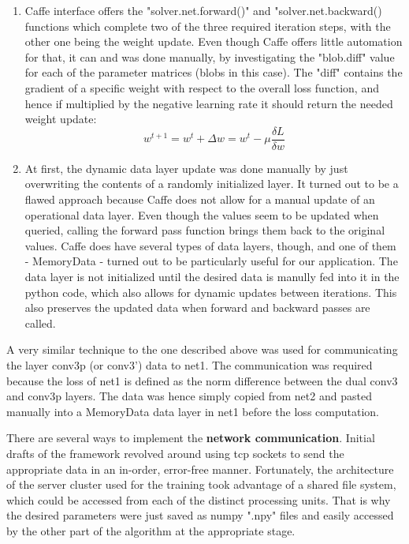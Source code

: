 \documentclass[a4paper, 12pt]{article}
\numberwithin{equation}{section}
\begin{document}
	\begin{enumerate}
		\item Caffe interface offers the "solver.net.forward()" and "solver.net.backward() functions which complete two of the three required iteration steps, with the other one being the weight update. Even though Caffe offers little automation for that, it can and was done manually, by investigating the "blob.diff" value for each of the parameter matrices (blobs in this case). The "diff" contains the gradient of a specific weight with respect to the overall loss function, and hence if multiplied by the negative learning rate it should return the needed weight update:
		\begin{equation}
		w^{t+1} = w^t + \Delta w = w^t - \mu \frac{\delta L}{\delta w}
		\end{equation}
		\item At first, the dynamic data layer update was done manually by just overwriting the contents of a randomly initialized layer.  It turned out to be a flawed approach because Caffe does not allow for a manual update of an operational data layer. Even though the values seem to be updated when queried, calling the forward pass function brings them back to the original values. Caffe does have several types of data layers, though, and one of them - MemoryData - turned out to be particularly useful for our application. The data layer is not initialized until the desired data is manully fed into it in the python code, which also allows for dynamic updates between iterations. This also preserves the updated data when forward and backward passes are called.
	\end{enumerate}
	
	A very similar technique to the one described above was used for communicating the layer conv3p (or conv3') data to net1. The communication was required because the loss of net1 is defined as the norm difference between the dual conv3 and conv3p layers. The data was hence simply copied from net2 and pasted manually into a MemoryData data layer in net1 before the loss computation.
	
	There are several ways to implement the \textbf{network communication}. Initial drafts of the framework revolved around using tcp sockets to send the appropriate data in an in-order, error-free manner. Fortunately, the architecture of the server cluster used for the training took advantage of a shared file system, which could be accessed from each of the distinct processing units. That is why the desired parameters were just saved as numpy ".npy" files and easily accessed by the other part of the algorithm at the appropriate stage.
	
\end{document}

